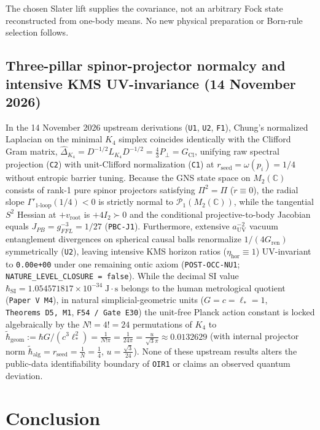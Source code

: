 \documentclass[11pt]{article}
\begin{document}
The chosen Slater lift supplies the covariance, not an arbitrary Fock state reconstructed from one-body means. No new physical preparation or Born-rule selection follows.


\subsection{Three-pillar spinor-projector normalcy and intensive KMS UV-invariance (14 November 2026)}
\label{sec:three-pillar-papervi-20261114}
In the 14 November 2026 upstream derivations (\texttt{U1}, \texttt{U2}, \texttt{F1}), Chung's normalized Laplacian on the minimal $K_4$ simplex coincides identically with the Clifford Gram matrix, $\widehat{\Delta}_{K_4}=D^{-1/2}L_{K_4}D^{-1/2}=\frac{4}{3}P_\perp=G_{\mathrm{Cl}}$, unifying raw spectral projection (\texttt{C2}) with unit-Clifford normalization (\texttt{C1}) at $r_{\mathrm{seed}}=\omega(p_i)=1/4$ without entropic barrier tuning. Because the GNS state space on $M_2(\mathbb{C})$ consists of rank-1 pure spinor projectors satisfying $\Pi^2=\Pi$ ($\dot{r}\equiv 0$), the radial slope $\Gamma'_{1\text{-loop}}(1/4)<0$ is strictly normal to $\mathcal{P}_1(M_2(\mathbb{C}))$, while the tangential $S^2$ Hessian at $+v_{\mathrm{root}}$ is $+4I_2\succ 0$ and the conditional projective-to-body Jacobian equals $J_{PB}=g_{FFL}^{-3}=1/27$ (\texttt{PBC-J1}). Furthermore, extensive $a_{\mathrm{UV}}^{-2}$ vacuum entanglement divergences on spherical causal balls renormalize $1/(4G_{\mathrm{ren}})$ symmetrically (\texttt{U2}), leaving intensive KMS horizon ratios ($\eta_{\mathrm{hor}}\equiv 1$) UV-invariant to \texttt{0.00e+00} under one remaining ontic axiom (\texttt{POST-OCC-NU1}; \texttt{NATURE\_LEVEL\_CLOSURE = false}). While the decimal SI value $\hbar_{\mathrm{SI}} = 1.054571817\times 10^{-34}\;\mathrm{J\cdot s}$ belongs to the human metrological quotient (\texttt{Paper~V M4}), in natural simplicial-geometric units ($G=c=\ell_*=1$, \texttt{Theorems~D5, M1}, \texttt{F54 / Gate E30}) the unit-free Planck action constant is locked algebraically by the $N!=4!=24$ permutations of $K_4$ to $\tilde{\hbar}_{\mathrm{geom}} := \hbar G/(c^3\ell_*^2) = \frac{1}{N!\pi} = \frac{1}{24\pi} = \frac{u}{\sqrt{3}\pi} \approx 0.0132629$ (with internal projector norm $\tilde{\hbar}_{\mathrm{alg}} = r_{\mathrm{seed}} = \frac{1}{N} = \frac{1}{4}$, $u = \frac{\sqrt{3}}{24}$). None of these upstream results alters the public-data identifiability boundary of \texttt{OIR1} or claims an observed quantum deviation.

\section{Conclusion}
\end{document}
